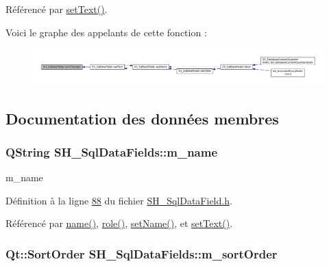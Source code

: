 Référencé par \hyperlink{classSH__SqlDataFields_a377b4964546e91bd344c8c6f5190a833}{set\-Text()}.



Voici le graphe des appelants de cette fonction \-:\nopagebreak
\begin{figure}[H]
\begin{center}
\leavevmode
\includegraphics[width=350pt]{classSH__SqlDataFields_ae91d833d4b50bff27c87015179b1ac24_icgraph}
\end{center}
\end{figure}




\subsection{Documentation des données membres}
\hypertarget{classSH__SqlDataFields_a3c0e82a8b6652335bdc53b211d39d4e2}{
\subsubsection[{m\-\_\-name}]{\setlength{\rightskip}{0pt plus 5cm}Q\-String S\-H\-\_\-\-Sql\-Data\-Fields\-::m\-\_\-name\hspace{0.3cm}{\ttfamily [private]}}}\label{classSH__SqlDataFields_a3c0e82a8b6652335bdc53b211d39d4e2}


m\-\_\-name 



Définition à la ligne \hyperlink{SH__SqlDataField_8h_source_l00088}{88} du fichier \hyperlink{SH__SqlDataField_8h_source}{S\-H\-\_\-\-Sql\-Data\-Field.\-h}.



Référencé par \hyperlink{classSH__SqlDataFields_a4951291928ce837435411166d66a5a3f}{name()}, \hyperlink{classSH__SqlDataFields_a6e5a9b95f0249a85ccf2fd0844ab7170}{role()}, \hyperlink{classSH__SqlDataFields_ab658a817f459e5d0a8c0f5c4e8c28a9d}{set\-Name()}, et \hyperlink{classSH__SqlDataFields_a377b4964546e91bd344c8c6f5190a833}{set\-Text()}.

\hypertarget{classSH__SqlDataFields_aa5dbfa2beef7114fba275d61135a6760}{
\subsubsection[{m\-\_\-sort\-Order}]{\setlength{\rightskip}{0pt plus 5cm}Qt\-::\-Sort\-Order S\-H\-\_\-\-Sql\-Data\-Fields\-::m\-\_\-sort\-Order\hspace{0.3cm}{\ttfamily [private]}}}\label{classSH__SqlDataFields_aa5dbfa2beef7114fba275d61135a6760}


